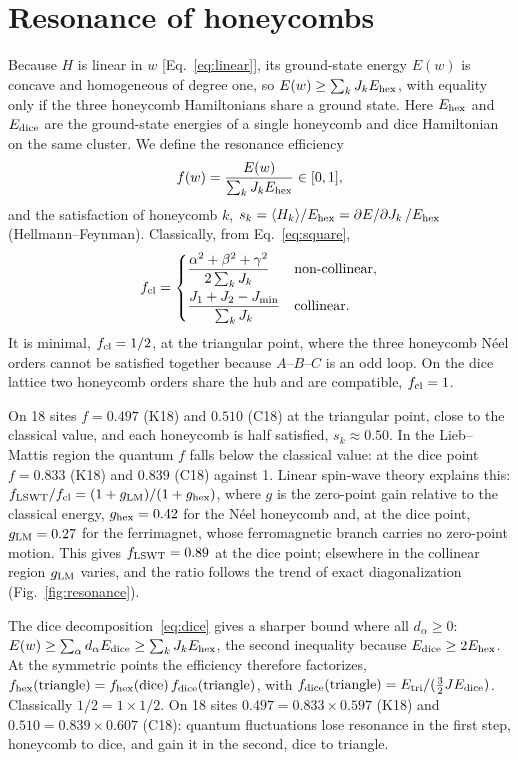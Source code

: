 \documentclass[prb,twocolumn,superscriptaddress,amsmath,amssymb,floatfix]{revtex4-2}
\begin{document}
\section{Resonance of honeycombs}
\label{sec:resonance}
Because $H$ is linear in $w$ [Eq.~\eqref{eq:linear}], its ground-state energy $E(w)$ is concave and homogeneous of degree one, so $E(w)\ge\sum_kJ_kE_{\rm hex}$, with equality only if the three honeycomb Hamiltonians share a ground state. Here $E_{\rm hex}$ and $E_{\rm dice}$ are the ground-state energies of a single honeycomb and dice Hamiltonian on the same cluster. We define the resonance efficiency
\begin{equation}
f(w)=\frac{E(w)}{\sum_kJ_kE_{\rm hex}}\in[0,1],
\label{eq:f}
\end{equation}
and the satisfaction of honeycomb $k$, $s_k=\langle H_k\rangle/E_{\rm hex}=\partial E/\partial J_k\,/E_{\rm hex}$ (Hellmann--Feynman). Classically, from Eq.~\eqref{eq:square},
\begin{equation}
f_{\rm cl}=
\begin{cases}
\dfrac{\alpha^2+\beta^2+\gamma^2}{2\sum_kJ_k} & \text{non-collinear},\\[2ex]
\dfrac{J_1+J_2-J_{\min}}{\sum_kJ_k} & \text{collinear}.
\end{cases}
\end{equation}
It is minimal, $f_{\rm cl}=1/2$, at the triangular point, where the three honeycomb N\'eel orders cannot be satisfied together because $A$--$B$--$C$ is an odd loop. On the dice lattice two honeycomb orders share the hub and are compatible, $f_{\rm cl}=1$.

On 18 sites $f=0.497$ (K18) and $0.510$ (C18) at the triangular point, close to the classical value, and each honeycomb is half satisfied, $s_k\approx0.50$. In the Lieb--Mattis region the quantum $f$ falls below the classical value: at the dice point $f=0.833$ (K18) and $0.839$ (C18) against 1. Linear spin-wave theory explains this: $f_{\rm LSWT}/f_{\rm cl}=(1+g_{\rm LM})/(1+g_{\rm hex})$, where $g$ is the zero-point gain relative to the classical energy, $g_{\rm hex}=0.42$ for the N\'eel honeycomb and, at the dice point, $g_{\rm LM}=0.27$ for the ferrimagnet, whose ferromagnetic branch carries no zero-point motion. This gives $f_{\rm LSWT}=0.89$ at the dice point; elsewhere in the collinear region $g_{\rm LM}$ varies, and the ratio follows the trend of exact diagonalization (Fig.~\ref{fig:resonance}).

The dice decomposition~\eqref{eq:dice} gives a sharper bound where all $d_\alpha\ge0$: $E(w)\ge\sum_\alpha d_\alpha E_{\rm dice}\ge\sum_kJ_kE_{\rm hex}$, the second inequality because $E_{\rm dice}\ge2E_{\rm hex}$. At the symmetric points the efficiency therefore factorizes, $f_{\rm hex}(\text{triangle})=f_{\rm hex}(\text{dice})\,f_{\rm dice}(\text{triangle})$, with $f_{\rm dice}(\text{triangle})=E_{\rm tri}/(\tfrac32JE_{\rm dice})$. Classically $1/2=1\times1/2$. On 18 sites $0.497=0.833\times0.597$ (K18) and $0.510=0.839\times0.607$ (C18): quantum fluctuations lose resonance in the first step, honeycomb to dice, and gain it in the second, dice to triangle.
\end{document}
